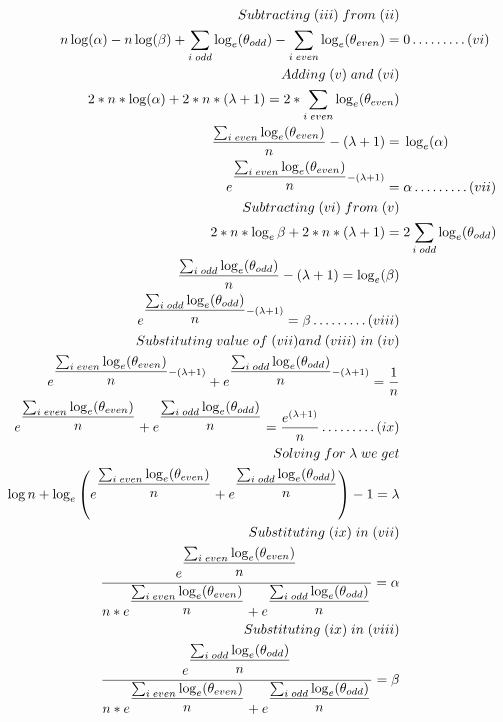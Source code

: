 \documentclass[english]{article}
\begin{document}
\begin{enumerate}
\begin{enumerate}
\begin{align*}
  	Subtracting \; (iii) \; from \; (ii) \\
 	n\log(\alpha) - n\log(\beta) + \sum_{i\; odd} \log_e (\theta_{odd})  - \sum_{i\; even} \log_e (\theta_{even}) = &\; 0 \ldots\ldots\ldots (vi) \\
	Adding \; (v) \; and \;(vi) \\
	2*n*\log(\alpha) + 2*n*(\lambda +1) = 2 * \sum_{i\; even} \log_e (\theta_{even}) \\
	 \dfrac{\sum_{i\; even} \log_e (\theta_{even})}{n} - (\lambda + 1) =&\; \log_e(\alpha) \\
	 e ^ {\dfrac{\sum_{i\; even} \log_e (\theta_{even})}{n} - (\lambda + 1)} =&\; \alpha  \ldots\ldots\ldots (vii)\\ 
	Subtracting \; (vi) \; from \;(v) \\
	2*n*\log_e{\beta} + 2*n*(\lambda +1) =&\; 2  \sum_{i\; odd} \log_e (\theta_{odd})\\
	\dfrac{\sum_{i\; odd} \log_e (\theta_{odd})}{n} - (\lambda +1) = \log_e(\beta) \\
	e ^ {\dfrac{\sum_{i\; odd} \log_e (\theta_{odd})}{n} - (\lambda +1)} = \beta \ldots\ldots\ldots (viii) \\
	Substituting\;value \;of \;(vii) and \;(viii) \;in \;(iv) \\
	 e ^ {\dfrac{\sum_{i\; even} \log_e (\theta_{even})}{n} - (\lambda + 1)} + e ^ {\dfrac{\sum_{i\; odd} \log_e (\theta_{odd})}{n} - (\lambda +1)} = \frac{1}{n} \\
	 e ^ {\dfrac{\sum_{i\; even} \log_e (\theta_{even})}{n}} +  e ^ {\dfrac{\sum_{i\; odd} \log_e (\theta_{odd})}{n}} = \frac{e^{(\lambda+1)}}{n} \ldots\ldots\ldots (ix)\\
	Solving\; for \;\lambda \; we\; get \\
	\log n + \log_e\left( e ^ {\dfrac{\sum_{i\; even} \log_e (\theta_{even})}{n}} +  e ^ {\dfrac{\sum_{i\; odd} \log_e (\theta_{odd})}{n}} \right) -1 = \lambda \\
	\pagebreak[4]
	Substituting\; (ix) \; in \;(vii) \\
	\dfrac{e ^ {\dfrac{\sum_{i\; even} \log_e (\theta_{even})}{n}}}{n * e ^ {\dfrac{\sum_{i\; even} \log_e (\theta_{even})}{n}} +  e ^ {\dfrac{\sum_{i\; odd} \log_e (\theta_{odd})}{n}}}  = \alpha \\
	Substituting\; (ix) \; in \;(viii) \\
	\dfrac{e ^ {\dfrac{\sum_{i\; odd} \log_e (\theta_{odd})}{n}}}{n * e ^ {\dfrac{\sum_{i\; even} \log_e (\theta_{even})}{n}} +  e ^ {\dfrac{\sum_{i\; odd} \log_e (\theta_{odd})}{n}}} = \beta \\
 \end{align*}
  \end{enumerate}
\end{enumerate}
\end{document}
